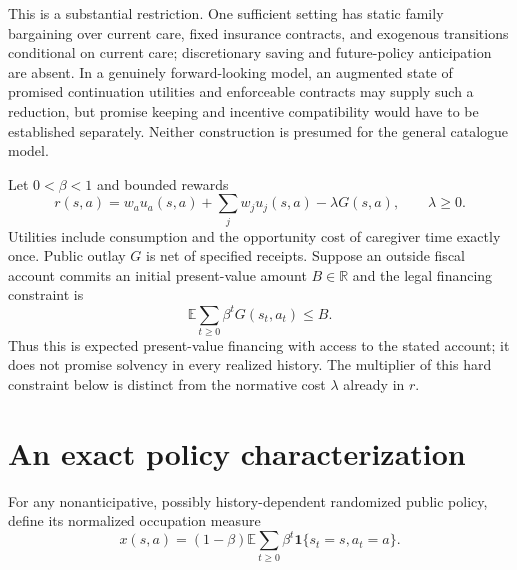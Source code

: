 \documentclass[11pt]{article}
\theoremstyle{remark}
\newcommand{\E}{\mathbb E}
\newcommand{\R}{\mathbb R}
\newcommand{\Ind}{\mathbf 1}
\begin{document}
This is a substantial restriction. One sufficient setting has static family bargaining over current care, fixed insurance contracts, and exogenous transitions conditional on current care; discretionary saving and future-policy anticipation are absent. In a genuinely forward-looking model, an augmented state of promised continuation utilities and enforceable contracts may supply such a reduction, but promise keeping and incentive compatibility would have to be established separately. Neither construction is presumed for the general catalogue model.

Let $0<\beta<1$ and bounded rewards
\[
 r(s,a)=w_a u_a(s,a)+\sum_jw_j u_j(s,a)-\lambda G(s,a),
 \qquad \lambda\geq0.
\]
Utilities include consumption and the opportunity cost of caregiver time exactly once. Public outlay $G$ is net of specified receipts. Suppose an outside fiscal account commits an initial present-value amount $B\in\R$ and the legal financing constraint is
\[
 \E\sum_{t\geq0}\beta^tG(s_t,a_t)\leq B.
\]
Thus this is expected present-value financing with access to the stated account; it does not promise solvency in every realized history. The multiplier of this hard constraint below is distinct from the normative cost $\lambda$ already in $r$.

\section{An exact policy characterization}
For any nonanticipative, possibly history-dependent randomized public policy, define its normalized occupation measure
\[
 x(s,a)=(1-\beta)\E\sum_{t\geq0}\beta^t
                         \Ind\{s_t=s,a_t=a\}.
\]
\end{document}
